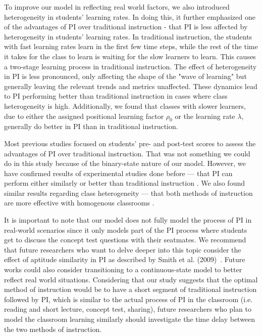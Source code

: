 To improve our model in reflecting real world factors, we also introduced heterogeneity in students' learning rates.
In doing this, it further emphasized one of the advantages of PI over traditional instruction - that PI is less affected by heterogeneity in students' learning rates.
In traditional instruction, the students with fast learning rates learn in the first few time steps, while the rest of the time it takes for the class to learn is waiting for the slow learners to learn.
This causes a two-stage learning process in traditional instruction.
The effect of heterogeneity in PI is less pronounced, only affecting the shape of the "wave of learning" but generally leaving the relevant trends and metrics unaffected.
These dynamics lead to PI performing better than traditional instruction in cases where class heterogeneity is high.
Additionally, we found that classes with slower learners, due to either the assigned positional learning factor $\rho_0$ or the learning rate $\lambda$, generally do better in PI than in traditional instruction.

Most previous studies focused on students' pre- and post-test scores to assess the advantages of PI over traditional instruction. 
That was not something we could do in this study because of the binary-state nature of our model.
However, we have confirmed results of experimental studies done before --- that PI can perform either similarly or better than traditional instruction \cite{crouch2001peer,lasry2008peer,thacker1994comparing,smith2009peer}.
We also found similar results regarding class heterogeneity --- that both methods of instruction are more effective with homogenous classrooms \cite{roxas2010seating}.

It is important to note that our model does not fully model the process of PI in real-world scenarios since it only models part of the PI process where students get to discuss the concept test questions with their seatmates.
We recommend that future researchers who want to delve deeper into this topic consider the effect of aptitude similarity in PI as described by Smith et al. (2009)~\cite{smith2009peer}.
Future works could also consider transitioning to a continuous-state model to better reflect real world situations.
Considering that our study suggests that the optimal method of instruction would be to have a short segment of traditional instruction followed by PI, which is similar to the actual process of PI in the classroom (i.e. reading and short lecture, concept test, sharing), future researchers who plan to model the classroom learning similarly should investigate the time delay between the two methods of instruction.